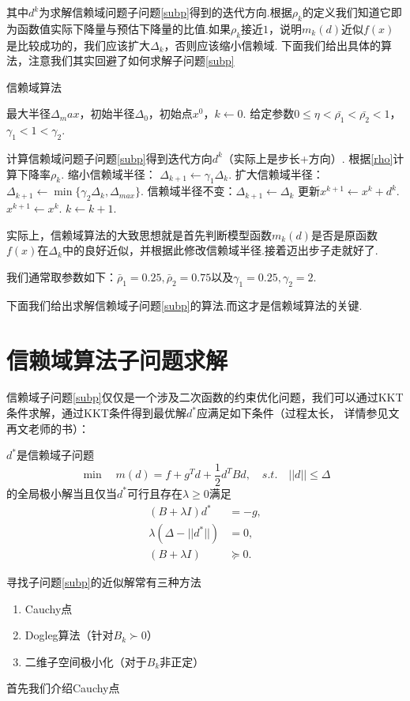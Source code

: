 其中$d^k$为求解信赖域问题子问题\eqref{subp}得到的迭代方向.根据$\rho_k$的定义我们知道它即为函数值实际下降量与预估下降量的比值.如果$\rho_k$接近$1$，说明$m_k(d)$近似$f(x)$是比较成功的，我们应该扩大$\Delta_k$，否则应该缩小信赖域.
下面我们给出具体的算法，注意我们其实回避了如何求解子问题\eqref{subp}
\begin{algorithm}[H]
\caption{信赖域算法}%
\begin{algorithmic}[1]%
\Require 最大半径$\Delta_max$，初始半径$\Delta_0$，初始点$x^0$，$k\leftarrow 0$.
\Require 给定参数$0\leq \eta < \bar{\rho_1}<\bar{\rho_2}<1$，$\gamma_1<1<\gamma_2$.

\State 计算信赖域问题子问题\eqref{subp}得到迭代方向$d^k$（实际上是步长+方向）.
\State 根据\eqref{rho}计算下降率$\rho_k$.
	\State 缩小信赖域半径： $\Delta_{k+1}\leftarrow \gamma_1 \Delta_k$.
\Else
		\State 扩大信赖域半径：$\Delta_{k+1} \leftarrow \min\{\gamma_2\Delta_k, \Delta_{max}\}$.
	\Else
		\State 信赖域半径不变：$\Delta_{k+1}\leftarrow \Delta_k$	
	\EndIf
\EndIf
{}
	\State 更新$x^{k+1} \leftarrow x^k+d^k$.
\Else
	\State $x^{k+1}\leftarrow x^k$.
\EndIf
\State $k\leftarrow k+1.$
\EndWhile
\end{algorithmic}  
\end{algorithm}
实际上，信赖域算法的大致思想就是首先判断模型函数$m_k(d)$是否是原函数$f(x)$在$\Delta_k$中的良好近似，并根据此修改信赖域半径.接着迈出步子走就好了.\par
我们通常取参数如下：$\bar\rho_1 = 0.25, \bar\rho_2=0.75$以及$\gamma_1=0.25, \gamma_2 = 2$.\par
下面我们给出求解信赖域子问题\eqref{subp}的算法.而这才是信赖域算法的关键.
\section{信赖域算法子问题求解}
信赖域子问题\eqref{subp}仅仅是一个涉及二次函数的约束优化问题，我们可以通过KKT条件求解，通过KKT条件得到最优解$d^*$应满足如下条件（过程太长， 详情参见文再文老师的书）：
\begin{theorem}
	$d^*$是信赖域子问题
	\begin{equation*}
		\min\quad m(d) = f + g^Td+\frac{1}{2}d^TBd, \quad s.t.\quad ||d||\leq \Delta
	\end{equation*}
	的全局极小解当且仅当$d^*$可行且存在$\lambda\geq 0$满足
	\begin{equation}
		\begin{split}
			(B+\lambda I)d^* &= -g,\\
			\lambda(\Delta- ||d^*||) &= 0,\\
			(B+\lambda I)& \succeq 0.
		\end{split}
	\end{equation}
\end{theorem}
寻找子问题\eqref{subp}的近似解常有三种方法
\begin{enumerate}
	\item Cauchy点
	\item Dogleg算法（针对$B_k\succ 0$）
	\item 二维子空间极小化（对于$B_k$非正定）
\end{enumerate}
首先我们介绍Cauchy点
